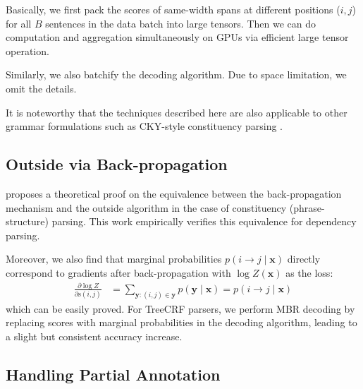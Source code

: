 \documentclass[11pt,a4paper]{article}
\begin{document}
Basically, we first pack the scores of same-width spans at different positions
($i, j$) for all $B$ sentences in the data batch into large tensors.
Then we can do computation and aggregation simultaneously on GPUs via efficient large tensor operation.


Similarly, we also batchify the decoding algorithm. Due to space limitation, we omit the details.

It is noteworthy that the techniques described here are also applicable to other grammar formulations such as CKY-style constituency parsing \cite{finkel-etal-2008-efficient,drozdov-etal-2019-unsupervised-latent}.


















\subsection{Outside via Back-propagation}

\citet{eisner-2016-inside} proposes a theoretical proof on the equivalence between
the back-propagation mechanism and the outside algorithm in the case of constituency (phrase-structure) parsing.
This work empirically verifies this equivalence for dependency parsing.


Moreover, we also find that marginal probabilities $p(i \rightarrow j\mid\boldsymbol{x})$ directly correspond to gradients after back-propagation with $\log Z(\boldsymbol{x})$ as the loss:
\begin{equation}
\label{equation:partial-derivative}
\begin{split}
\frac{\partial \log Z}{\partial \mathrm{s}(i, j)} &= \sum_{\boldsymbol{y}:(i,j) \in \boldsymbol{{y}}} p(\boldsymbol{y}\mid\boldsymbol{x}) = p(i \rightarrow j\mid\boldsymbol{x})
\end{split}
\end{equation}
which can be easily proved. For TreeCRF parsers, we perform MBR decoding \cite{smith-smith-2007-probabilistic} by replacing scores with marginal probabilities in the decoding algorithm,
leading to a slight but consistent accuracy increase.





\subsection{Handling Partial Annotation}
\label{sub@section:partial-annotation}
\end{document}
